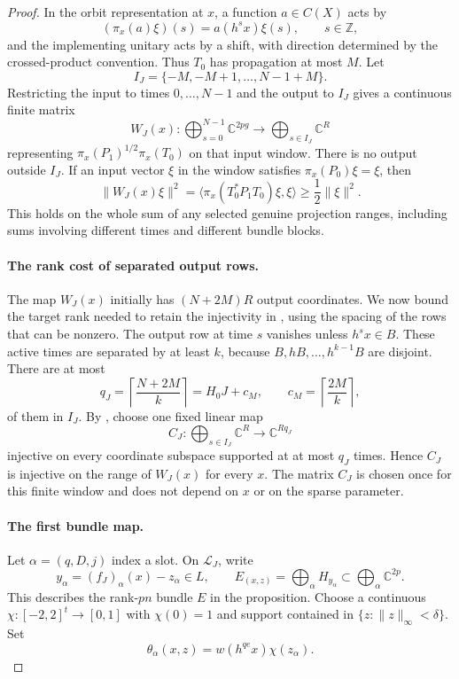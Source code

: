 \begin{proof}
In the orbit representation at $x$, a function $a\in C(X)$ acts by
\[
 (\pi_x(a)\xi)(s)=a(h^sx)\xi(s),\qquad s\in\mathbb Z,
\]
and the implementing unitary acts by a shift, with direction determined
by the crossed-product convention.  Thus $T_0$ has propagation at most
$M$.  Let
\[
 I_J=\{-M,-M+1,\ldots,N-1+M\}.
\]
Restricting the input to times $0,\ldots,N-1$ and the output to $I_J$
gives a continuous finite matrix
\[
 W_J(x):\bigoplus_{s=0}^{N-1}\mathbb C^{2pg}
          \longrightarrow\bigoplus_{s\in I_J}\mathbb C^R
\]
representing $\pi_x(P_1)^{1/2}\pi_x(T_0)$ on that input window.
There is no output outside $I_J$.  If an input vector $\xi$ in the
window satisfies $\pi_x(P_0)\xi=\xi$, then
\begin{equation}
\label{eq:whole-projection-sum-injection}
 \|W_J(x)\xi\|^2
 =\langle\pi_x(T_0^*P_1T_0)\xi,\xi\rangle
 \geq\frac12\|\xi\|^2.
\end{equation}
This holds on the whole sum of any selected genuine projection ranges,
including sums involving different times and different bundle blocks.

\paragraph{The rank cost of separated output rows.}
The map $W_J(x)$ initially has $(N+2M)R$ output coordinates.
We now bound the target rank needed to retain the injectivity in
, using the spacing of the
rows that can be nonzero.
The output row at time $s$ vanishes unless $h^sx\in B$.  These active
times are separated by at least $k$, because
$B,hB,\ldots,h^{k-1}B$ are disjoint.  There are at most
\[
 q_J=\left\lceil\frac{N+2M}{k}\right\rceil
       =H_0J+c_M,\qquad c_M=\left\lceil\frac{2M}{k}\right\rceil,
\]
of them in $I_J$.  By , choose
one fixed linear map
\[
 C_J:\bigoplus_{s\in I_J}\mathbb C^R\longrightarrow\mathbb C^{Rq_J}
\]
injective on every coordinate subspace supported at at most $q_J$
times.  Hence $C_J$ is injective on the range of $W_J(x)$ for every
$x$.  The matrix $C_J$ is chosen once for this finite window and does
not depend on $x$ or on the sparse parameter.

\paragraph{The first bundle map.}
Let $\alpha=(q,D,j)$ index a slot.  On $\mathcal L_J$, write
\[
 y_\alpha=(f_J)_\alpha(x)-z_\alpha\in L,
 \qquad
 E_{(x,z)}=\bigoplus_\alpha H_{y_\alpha}
                  \subset\bigoplus_\alpha\mathbb C^{2p}.
\]
This describes the rank-$pn$ bundle $E$ in the proposition.
Choose a continuous $\chi:[-2,2]^t\to[0,1]$ with $\chi(0)=1$ and
support contained in $\{z:\|z\|_\infty<\delta\}$.  Set
\begin{equation}
\label{eq:slot-weights}
 \theta_\alpha(x,z)=w(h^{qe}x)\chi(z_\alpha).
\end{equation}


\end{proof}
